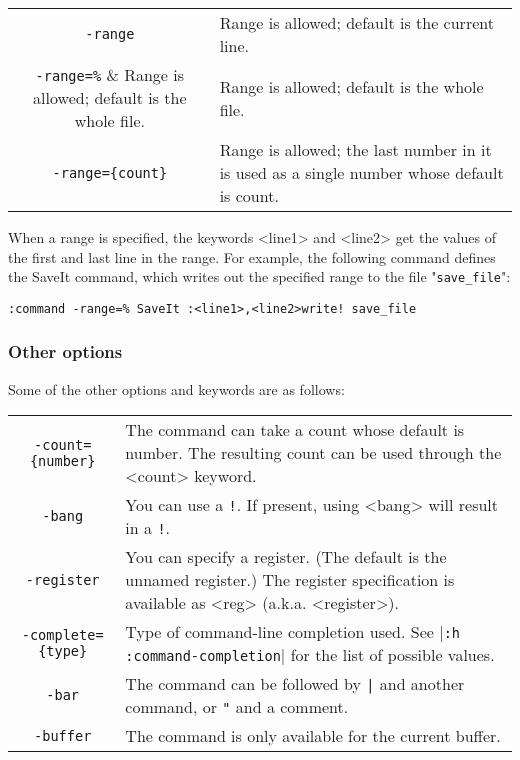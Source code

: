 {\begin{center} \begin{tabularx}{\textwidth}{c X}
				\verb;-range; & Range is allowed; default is the current line. \\
				\verb;-range=%; & Range is allowed; default is the whole file. \\
				\verb;-range={count}; & Range is allowed; the last number in it is used as a single number whose default is {count}. \\
\end{tabularx} \end{center}

When a range is specified, the keywords <line1> and <line2> get the values of the first and last line in the range.
For example, the following command defines the SaveIt command, which writes out the specified range to the file "\verb!save_file!":

\begin{Verbatim}[samepage=true]
 :command -range=% SaveIt :<line1>,<line2>write! save_file
\end{Verbatim}
\subsubsection{Other options}
Some of the other options and keywords are as follows:

\begin{center} \begin{tabular}{c l}
				\verb;-count={number}; & The command can take a count whose default is {number}.
				The resulting count can be used through the <count> keyword. \\
				\verb;-bang; & You can use a \verb:!:.
				If present, using <bang> will result in a \verb:!:. \\
				\verb;-register; & You can specify a register.
				(The default is the unnamed register.)
				The register specification is available as <reg> (a.k.a. <register>). \\
				\verb;-complete={type}; & Type of command-line completion used.  See |\verb!:h :command-completion!| for the list of possible values. \\
				\verb;-bar; & The command can be followed by \verb!|! and another command, or \verb!"! and a comment. \\
				\verb;-buffer; & The command is only available for the current buffer. \\
\end{tabular} \end{center}

}
